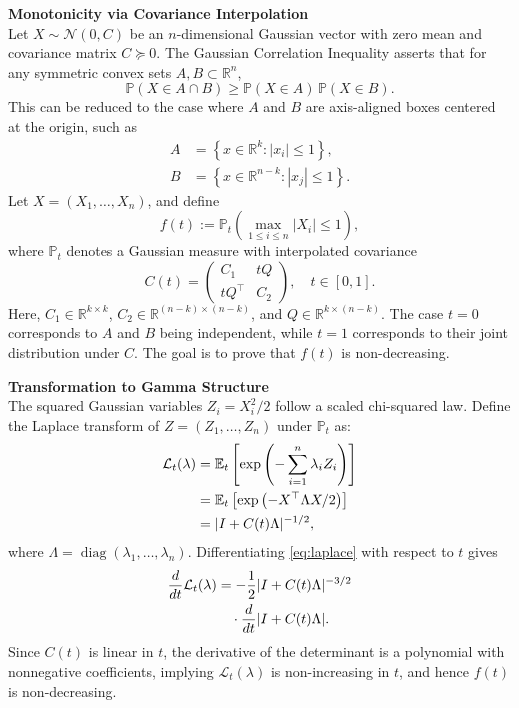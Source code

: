 \begin{technical}
{\Large\textbf{Monotonicity via Covariance Interpolation}}\\
Let \( X \sim \mathcal{N}(0, C) \) be an \( n \)-dimensional Gaussian vector with zero mean and covariance matrix \( C \succcurlyeq 0 \). The Gaussian Correlation Inequality asserts that for any symmetric convex sets \( A, B \subset \mathbb{R}^n \),
\[
\mathbb{P}(X \in A \cap B) \ge \mathbb{P}(X \in A)\,\mathbb{P}(X \in B).
\]
This can be reduced to the case where \( A \) and \( B \) are axis-aligned boxes centered at the origin, such as
\begin{align}
A &= \left\{ x \in \mathbb{R}^k : |x_i| \le 1 \right\}, \quad\\
B &= \left\{ x \in \mathbb{R}^{n-k} : |x_j| \le 1 \right\}.
\end{align}
Let \( X = (X_1, \dots, X_n) \), and define
\[
f(t) := \mathbb{P}_t\left( \max_{1 \le i \le n} |X_i| \le 1 \right),
\]
where \( \mathbb{P}_t \) denotes a Gaussian measure with interpolated covariance
\[
C(t) = 
\begin{pmatrix}
C_1 & tQ \\
tQ^\top & C_2
\end{pmatrix}, \quad t \in [0,1].
\]
Here, \( C_1 \in \mathbb{R}^{k \times k} \), \( C_2 \in \mathbb{R}^{(n-k) \times (n-k)} \), and \( Q \in \mathbb{R}^{k \times (n-k)} \). The case \( t = 0 \) corresponds to \( A \) and \( B \) being independent, while \( t = 1 \) corresponds to their joint distribution under \( C \). The goal is to prove that \( f(t) \) is non-decreasing.

\noindent\textbf{Transformation to Gamma Structure}\\
The squared Gaussian variables \( Z_i = X_i^2 / 2 \) follow a scaled chi-squared law. Define the Laplace transform of \( Z = (Z_1, \dots, Z_n) \) under \( \mathbb{P}_t \) as:
\begin{align}
\mathcal{L}_t(\lambda) 
&= \mathbb{E}_t \left[ \exp\left( -\sum_{i=1}^n \lambda_i Z_i \right) \right] \notag \\
&= \mathbb{E}_t \left[ \exp\left( -X^\top \Lambda X / 2 \right) \right] \notag \\
&= |I + C(t) \Lambda|^{-1/2}, \label{eq:laplace}
\end{align}
where \( \Lambda = \operatorname{diag}(\lambda_1, \dots, \lambda_n) \). Differentiating \eqref{eq:laplace} with respect to \( t \) gives
\begin{align}
\frac{d}{dt} \mathcal{L}_t(\lambda) 
&= -\frac{1}{2} |I + C(t)\Lambda|^{-3/2} \notag \\
&\quad \cdot \frac{d}{dt} |I + C(t)\Lambda|. \label{eq:laplace-deriv}
\end{align}
Since \( C(t) \) is linear in \( t \), the derivative of the determinant is a polynomial with nonnegative coefficients, implying \( \mathcal{L}_t(\lambda) \) is non-increasing in \( t \), and hence \( f(t) \) is non-decreasing.


\end{technical}
